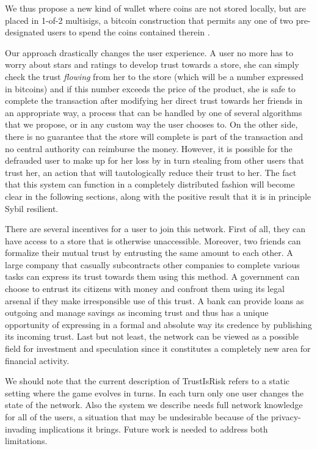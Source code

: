 \documentclass[11pt]{article}
\theoremstyle{definition}
\theoremstyle{corollary}
\theoremstyle{lemma}
\begin{document}
     We thus propose a new kind of wallet where coins are not stored locally, but are placed in 1-of-2 multisigs, a bitcoin
     construction that permits any one of two pre-designated users to spend the coins contained therein \cite{multisig}.

     Our approach drastically changes the user experience. A user no more has to worry about stars and ratings to develop
     trust towards a store, she can simply check the trust \textit{flowing} from her to the store (which will be a number
     expressed in bitcoins) and if this number exceeds the price of the product, she is safe to complete the transaction
     after modifying her direct trust towards her friends in an appropriate way, a process that can be handled by one of
     several algorithms that we propose, or in any custom way the user chooses to. On the other side, there is no guarantee
     that the store will complete is part of the transaction and no central authority can reimburse the money. However, it is
     possible for the defrauded user to make up for her loss by in turn stealing from other users that trust her, an action
     that will tautologically reduce their trust to her. The fact that this system can function in a completely distributed
     fashion will become clear in the following sections, along with the positive result that it is in principle Sybil
     resilient.

     There are several incentives for a user to join this network. First of all, they can have access to a store that is
     otherwise unaccessible. Moreover, two friends can formalize their mutual trust by entrusting the same amount to each
     other. A large company that casually subcontracts other companies to complete various tasks can express its trust
     towards them using this method. A government can choose to entrust its citizens with money and confront them using its
     legal arsenal if they make irresponsible use of this trust. A bank can provide loans as outgoing and manage savings as
     incoming trust and thus has a unique opportunity of expressing in a formal and absolute way its credence by publishing
     its incoming trust. Last but not least, the network can be viewed as a possible field for investment and speculation
     since it constitutes a completely new area for financial activity.

     We should note that the current description of TrustIsRisk refers to a static setting where the game evolves in turns.
     In each turn only one user changes the state of the network. Also the system we describe needs full network knowledge
     for all of the users, a situation that may be undesirable because of the privacy-invading implications it brings.
     Future work is needed to address both limitations.
\end{document}
